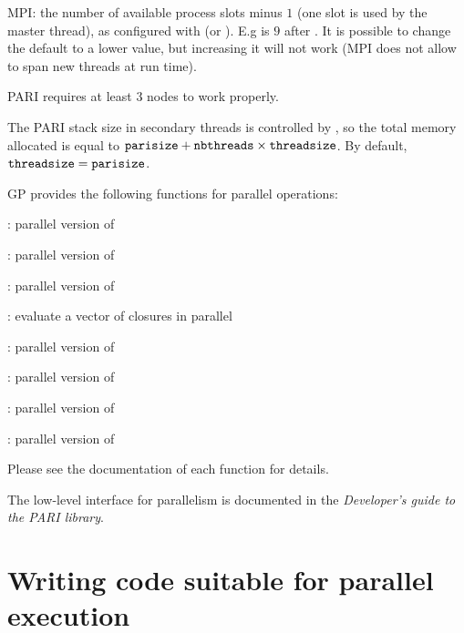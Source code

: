 \item MPI: the number of available process slots minus $1$ (one slot is used by
the master thread), as configured with  (or ). E.g
 is $9$ after .
It is possible to change the default to a lower value, but increasing it will
not work (MPI does not allow to span new threads at run time).

PARI requires at least $3$ nodes to work properly.

The PARI stack size in secondary threads is controlled by
, so the total memory allocated is equal to
${\tt parisize}+{\tt nbthreads}\times{\tt threadsize}$.  By default,
${\tt threadsize}={\tt parisize}$.


GP provides the following functions for parallel operations:

\item {}: parallel version of 

\item {}:  parallel version of 

\item {}:    parallel version of 

\item {}:   evaluate a vector of closures in parallel

\item {}:    parallel version of 

\item {}:   parallel version of 

\item {}: parallel version of 

\item {}: parallel version of 

Please see the documentation of each function for details.

The low-level  interface for parallelism is documented
in the \emph{Developer's guide to the PARI library}.

\chapter{Writing code suitable for parallel execution}

